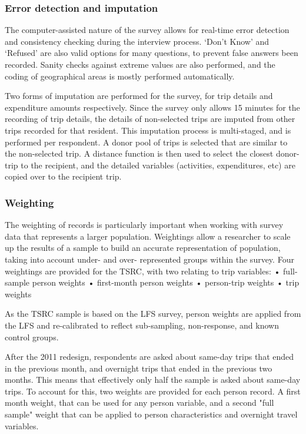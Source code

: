 \subsubsection{Error detection and imputation}
The computer-assisted nature of the survey allows for real-time error detection and consistency checking during the interview process. ‘Don’t Know’ and ‘Refused’ are also valid options for many questions, to prevent false answers been recorded. Sanity checks against extreme values are also performed, and the coding of geographical areas is mostly performed automatically.

Two forms of imputation are performed for the survey, for trip details and expenditure amounts respectively. Since the survey only allows 15 minutes for the recording of trip details, the details of non-selected trips are imputed from other trips recorded for that resident. This imputation process is multi-staged, and is performed per respondent. A donor pool of trips is selected that are similar to the non-selected trip. A distance function is then used to select the closest donor-trip to the recipient, and the detailed variables (activities, expenditures, etc) are copied over to the recipient trip.

\subsubsection{Weighting}
The weighting of records is particularly important when working with survey data that represents a larger population. Weightings allow a researcher to scale up the results of a sample to build an accurate representation of population, taking into account under- and over- represented groups within the survey. Four weightings are provided for the TSRC, with two relating to trip variables:
•	full-sample person weights
•	first-month person weights
•	person-trip weights
•	trip weights

As the TSRC sample is based on the LFS survey, person weights are applied from the LFS and re-calibrated to reflect sub-sampling, non-response, and known control groups. 

After the 2011 redesign, respondents are asked about same-day trips that ended in the previous month, and overnight trips that ended in the previous two months. This means that effectively only half the sample is asked about same-day trips. To account for this, two weights are provided for each person record. A first month weight, that can be used for any person variable, and a second "full sample" weight that can be applied to person characteristics and overnight travel variables.


